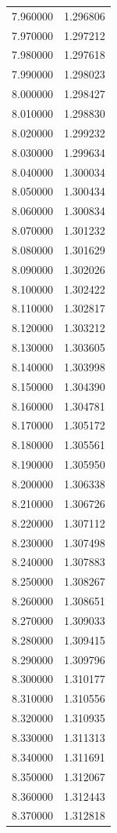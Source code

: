 \begin{tabular}{rr}
7.960000 & 1.296806 \\
7.970000 & 1.297212 \\
7.980000 & 1.297618 \\
7.990000 & 1.298023 \\
8.000000 & 1.298427 \\
8.010000 & 1.298830 \\
8.020000 & 1.299232 \\
8.030000 & 1.299634 \\
8.040000 & 1.300034 \\
8.050000 & 1.300434 \\
8.060000 & 1.300834 \\
8.070000 & 1.301232 \\
8.080000 & 1.301629 \\
8.090000 & 1.302026 \\
8.100000 & 1.302422 \\
8.110000 & 1.302817 \\
8.120000 & 1.303212 \\
8.130000 & 1.303605 \\
8.140000 & 1.303998 \\
8.150000 & 1.304390 \\
8.160000 & 1.304781 \\
8.170000 & 1.305172 \\
8.180000 & 1.305561 \\
8.190000 & 1.305950 \\
8.200000 & 1.306338 \\
8.210000 & 1.306726 \\
8.220000 & 1.307112 \\
8.230000 & 1.307498 \\
8.240000 & 1.307883 \\
8.250000 & 1.308267 \\
8.260000 & 1.308651 \\
8.270000 & 1.309033 \\
8.280000 & 1.309415 \\
8.290000 & 1.309796 \\
8.300000 & 1.310177 \\
8.310000 & 1.310556 \\
8.320000 & 1.310935 \\
8.330000 & 1.311313 \\
8.340000 & 1.311691 \\
8.350000 & 1.312067 \\
8.360000 & 1.312443 \\
8.370000 & 1.312818 \\

\end{tabular}
